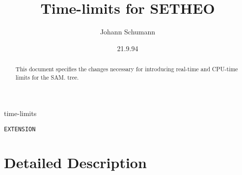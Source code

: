

\title{Time-limits for SETHEO}
\author{Johann Schumann}
\date{21.9.94}



\maketitle

\begin{abstract}
This document specifies the changes necessary for introducing
real-time and CPU-time limits for the SAM.
tree.

\end{abstract}

  time-limits

 {\tt EXTENSION}

\section{Detailed Description}

